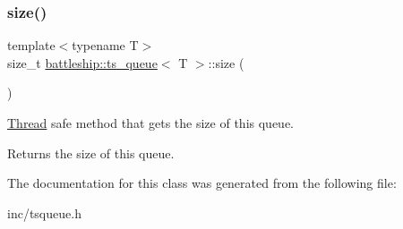 \subsubsection{\texorpdfstring{size()}{size()}}
{\footnotesize\ttfamily template$<$typename T$>$ \\
size\+\_\+t \hyperlink{classbattleship_1_1ts__queue}{battleship\+::ts\+\_\+queue}$<$ T $>$\+::size (\begin{DoxyParamCaption}{ }\end{DoxyParamCaption})\hspace{0.3cm}{\ttfamily [inline]}}

\hyperlink{classThread}{Thread} safe method that gets the size of this queue.

\begin{DoxyReturn}{Returns}
the size of this queue. 
\end{DoxyReturn}


The documentation for this class was generated from the following file\+:\begin{DoxyCompactItemize}
\item 
inc/tsqueue.\+h\end{DoxyCompactItemize}
